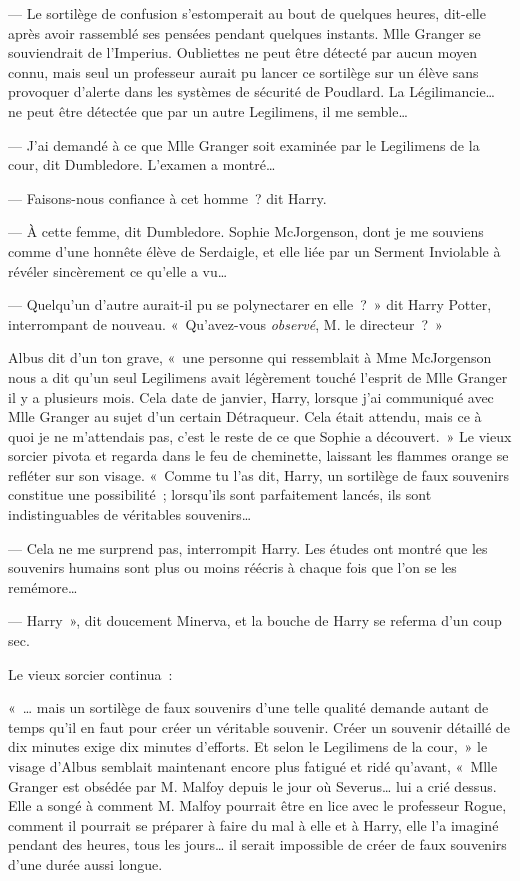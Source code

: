 --- Le sortilège de confusion s'estomperait au bout de quelques heures, dit-elle après avoir rassemblé ses pensées pendant quelques instants.
Mlle Granger se souviendrait de l'Imperius.
Oubliettes ne peut être détecté par aucun moyen connu, mais seul un professeur aurait pu lancer ce sortilège sur un élève sans provoquer d'alerte dans les systèmes de sécurité de Poudlard.
La Légilimancie… ne peut être détectée que par un autre Legilimens, il me semble…

--- J'ai demandé à ce que Mlle Granger soit examinée par le Legilimens de la cour, dit Dumbledore.
L'examen a montré…

--- Faisons-nous confiance à cet homme~? dit Harry.

--- À cette femme, dit Dumbledore.
Sophie McJorgenson, dont je me souviens comme d'une honnête élève de Serdaigle, et elle liée par un Serment Inviolable à révéler sincèrement ce qu'elle a vu…

--- Quelqu'un d'autre aurait-il pu se polynectarer en elle~?~»
dit Harry Potter, interrompant de nouveau.
«~Qu'avez-vous \emph{observé}, M. le directeur~?~»

Albus dit d'un ton grave, «~une personne qui ressemblait à Mme McJorgenson nous a dit qu'un seul Legilimens avait légèrement touché l'esprit de Mlle Granger il y a plusieurs mois.
Cela date de janvier, Harry, lorsque j'ai communiqué avec Mlle Granger au sujet d'un certain Détraqueur.
Cela était attendu, mais ce à quoi je ne m'attendais pas, c'est le reste de ce que Sophie a découvert.~»
Le vieux sorcier pivota et regarda dans le feu de cheminette, laissant les flammes orange se refléter sur son visage.
«~Comme tu l'as dit, Harry, un sortilège de faux souvenirs constitue une possibilité~; lorsqu'ils sont parfaitement lancés, ils sont indistinguables de véritables souvenirs…

--- Cela ne me surprend pas, interrompit Harry.
Les études ont montré que les souvenirs humains sont plus ou moins réécris à chaque fois que l'on se les remémore…

--- Harry~», dit doucement Minerva, et la bouche de Harry se referma d'un coup sec.

Le vieux sorcier continua~:

«~… mais un sortilège de faux souvenirs d'une telle qualité demande autant de temps qu'il en faut pour créer un véritable souvenir.
Créer un souvenir détaillé de dix minutes exige dix minutes d'efforts.
Et selon le Legilimens de la cour,~» le visage d'Albus semblait maintenant encore plus fatigué et ridé qu'avant, «~Mlle Granger est obsédée par M. Malfoy depuis le jour où Severus… lui a crié dessus.
Elle a songé à comment M. Malfoy pourrait être en lice avec le professeur Rogue, comment il pourrait se préparer à faire du mal à elle et à Harry, elle l'a imaginé pendant des heures, tous les jours… il serait impossible de créer de faux souvenirs d'une durée aussi longue.

